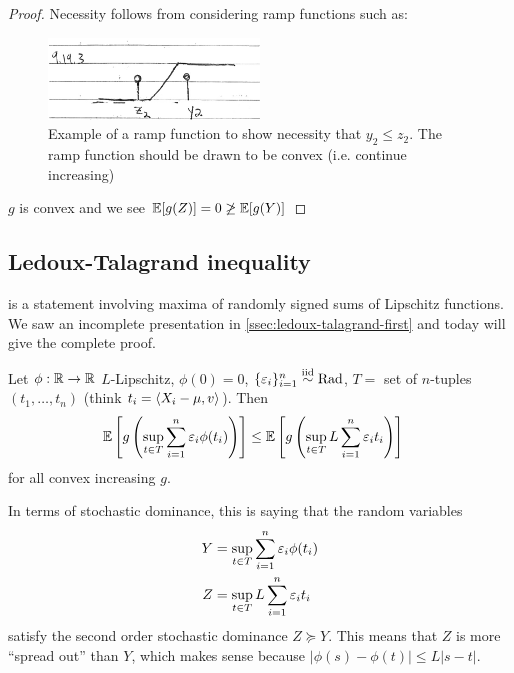 \begin{proof}
  Necessity follows from considering ramp functions such as:
  \begin{figure}[H]
    \begin{center}
      \includegraphics[width=0.5\textwidth]{figures/9-19-3.png}
    \end{center}
    \caption{Example of a ramp function to show necessity that $y_2 \leq z_2$.
      The ramp function should be drawn to be convex (i.e. continue increasing)}
  \end{figure}
  $g$ is convex and we see $\mathbb{E}[g(Z)] = 0 \not\geq \mathbb{E}[g(Y)]$

\end{proof}

\subsection{Ledoux-Talagrand inequality}%

 is a statement involving maxima of randomly signed
sums of Lipschitz functions.
We saw an incomplete presentation in \cref{ssec:ledoux-talagrand-first} and
today will give the complete proof.

\begin{theorem}\label{thm:ledoux-talagrand}
  Let $\phi : \mathbb{R} \to \mathbb{R}$ $L$-Lipschitz, $\phi(0) = 0$,
  $\{\varepsilon_i\}_{i=1}^n \overset{\text{iid}}{\sim} \text{Rad}$, $T =$ set of $n$-tuples $(t_1,\ldots,t_n)$
  (think $t_i = \braket{X_i - \mu, v}$). Then
  \begin{align}
    \mathbb{E}\left[g \left(
        \sup_{t \in T} \sum_{i=1}^n \varepsilon_i \phi(t_i)
    \right)\right]
    &\leq \mathbb{E}\left[
      g\left(
        \sup_{t \in T} L \sum_{i=1}^n \varepsilon_i t_i
      \right)
    \right]
  \end{align}
  for all convex increasing $g$.
\end{theorem}

In terms of stochastic dominance, this is saying that the random variables
\begin{align}
  Y &= \sup_{t \in T} \sum_{i=1}^n \varepsilon_i \phi(t_i) \\
  Z &= \sup_{t \in T} L \sum_{i=1}^n \varepsilon_i t_i
\end{align}
satisfy the second order stochastic dominance $Z \succeq Y$.
This means that $Z$ is more ``spread out'' than $Y$, which makes sense because
$\lvert \phi(s) - \phi(t) \rvert \leq L \lvert s - t \rvert$.

